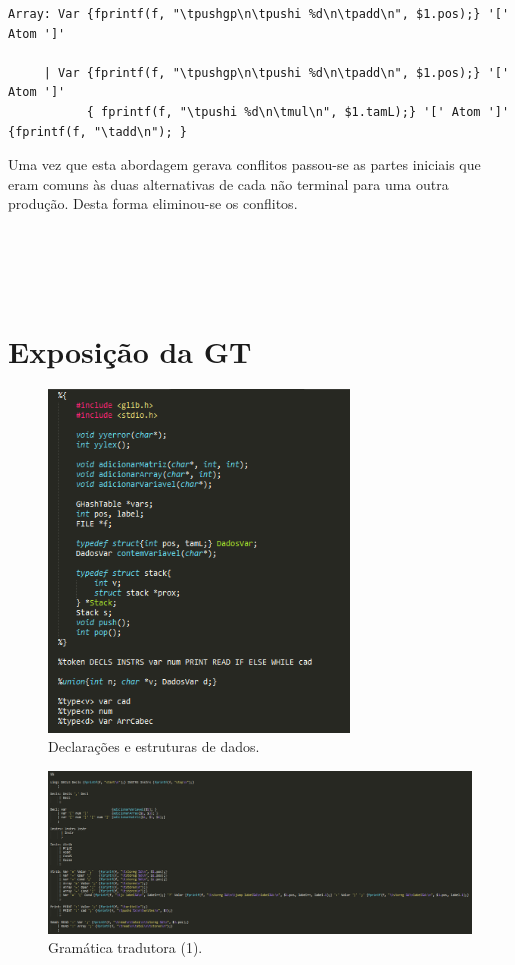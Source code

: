 \documentclass{report}
\begin{document}
\begin{itemize}
\begin{verbatim}
Array: Var {fprintf(f, "\tpushgp\n\tpushi %d\n\tpadd\n", $1.pos);} '[' Atom ']'

     | Var {fprintf(f, "\tpushgp\n\tpushi %d\n\tpadd\n", $1.pos);} '[' Atom ']'
           { fprintf(f, "\tpushi %d\n\tmul\n", $1.tamL);} '[' Atom ']' {fprintf(f, "\tadd\n"); }
\end{verbatim}
Uma vez que esta abordagem gerava conflitos passou-se as partes iniciais que eram comuns às duas alternativas de cada não terminal para uma outra produção. Desta forma eliminou-se os conflitos.\\\\\\\\\\
\end{itemize}
\section{Exposição da GT}
\begin{figure}[ht]
\centering
\includegraphics[width=80mm, scale=0.5]{gt1.png}
\caption{\label{fig:change}Declarações e estruturas de dados.}
\end{figure}

\begin{figure}[ht]
\centering
\includegraphics[width=180mm, scale=0.9]{gt2.PNG}
\caption{\label{fig:change}Gramática tradutora (1).}
\end{figure}
\end{document}
